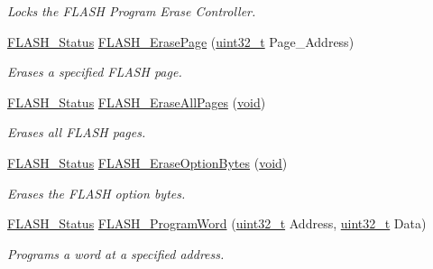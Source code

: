 \begin{DoxyCompactItemize}
\begin{DoxyCompactList}\small\item\em Locks the F\+L\+A\+SH Program Erase Controller. \end{DoxyCompactList}\item 
\hyperlink{group___f_l_a_s_h___exported___types_gadc63a6f3404ff1f71229a66915e9cdc0}{F\+L\+A\+S\+H\+\_\+\+Status} \hyperlink{group___f_l_a_s_h___exported___functions_ga13a2ca18bfb3d5fb827a2751799f8451}{F\+L\+A\+S\+H\+\_\+\+Erase\+Page} (\hyperlink{_p_e___types_8h_a33594304e786b158f3fb30289278f5af}{uint32\+\_\+t} Page\+\_\+\+Address)
\begin{DoxyCompactList}\small\item\em Erases a specified F\+L\+A\+SH page. \end{DoxyCompactList}\item 
\hyperlink{group___f_l_a_s_h___exported___types_gadc63a6f3404ff1f71229a66915e9cdc0}{F\+L\+A\+S\+H\+\_\+\+Status} \hyperlink{group___f_l_a_s_h___exported___functions_gab2e6dea62c72b3e47c17512579d37498}{F\+L\+A\+S\+H\+\_\+\+Erase\+All\+Pages} (\hyperlink{usb__devapi_8h_afabf60e7f57651d6d595a02c75f07cd0}{void})
\begin{DoxyCompactList}\small\item\em Erases all F\+L\+A\+SH pages. \end{DoxyCompactList}\item 
\hyperlink{group___f_l_a_s_h___exported___types_gadc63a6f3404ff1f71229a66915e9cdc0}{F\+L\+A\+S\+H\+\_\+\+Status} \hyperlink{group___f_l_a_s_h___exported___functions_ga152768609e85d74a9d8474be8dc2874b}{F\+L\+A\+S\+H\+\_\+\+Erase\+Option\+Bytes} (\hyperlink{usb__devapi_8h_afabf60e7f57651d6d595a02c75f07cd0}{void})
\begin{DoxyCompactList}\small\item\em Erases the F\+L\+A\+SH option bytes. \end{DoxyCompactList}\item 
\hyperlink{group___f_l_a_s_h___exported___types_gadc63a6f3404ff1f71229a66915e9cdc0}{F\+L\+A\+S\+H\+\_\+\+Status} \hyperlink{group___f_l_a_s_h___exported___functions_gaac9a2f400b92537bd42a6bd7cc237b11}{F\+L\+A\+S\+H\+\_\+\+Program\+Word} (\hyperlink{_p_e___types_8h_a33594304e786b158f3fb30289278f5af}{uint32\+\_\+t} Address, \hyperlink{_p_e___types_8h_a33594304e786b158f3fb30289278f5af}{uint32\+\_\+t} Data)
\begin{DoxyCompactList}\small\item\em Programs a word at a specified address. \end{DoxyCompactList}\item 

\end{DoxyCompactItemize}
